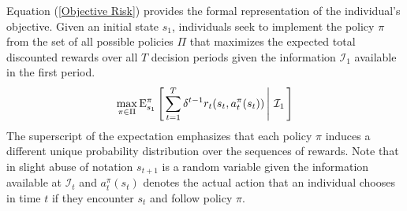 \noindent Equation (\ref{Objective Risk}) provides the formal representation of the individual's objective. Given an initial state $s_1$, individuals seek to implement the policy $\pi$ from the set of all possible policies $\Pi$ that maximizes the expected total discounted rewards over all $T$ decision periods given the information $\mathcal{I}_1$ available in the first period.
%
\begin{align}\label{Objective Risk}
\max_{\pi \in\Pi} \mathrm{E}_{s_1}^\pi\left[\left.\sum^{T}_{t = 1}  \delta^{t - 1} r_t(s_t, a^\pi_t(s_t))\,\right\vert\,\mathcal{I}_1\,\right]
\end{align}
%
The superscript of the expectation emphasizes that each policy $\pi$ induces a different unique probability distribution over the sequences of rewards. Note that in slight abuse of notation $s_{t + 1}$ is a random variable given the information available at $\mathcal{I}_t$ and $a^\pi_{t}(s_{t})$ denotes the actual action that an individual chooses in time $t$ if they encounter $s_{t}$ and follow policy $\pi$.
